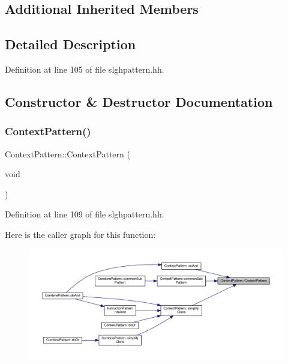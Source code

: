 \subsection*{Additional Inherited Members}


\subsection{Detailed Description}


Definition at line 105 of file slghpattern.\+hh.



\subsection{Constructor \& Destructor Documentation}
\mbox{\label{class_context_pattern_a66b65ac40587ea7fcb7056341ae5a217}} 
\subsubsection{\texorpdfstring{ContextPattern()}{ContextPattern()}\hspace{0.1cm}{\footnotesize\ttfamily [1/2]}}
{\footnotesize\ttfamily Context\+Pattern\+::\+Context\+Pattern (\begin{DoxyParamCaption}\item[{void}]{ }\end{DoxyParamCaption})\hspace{0.3cm}{\ttfamily [inline]}}



Definition at line 109 of file slghpattern.\+hh.

Here is the caller graph for this function\+:
\nopagebreak
\begin{figure}[H]
\begin{center}
\leavevmode
\includegraphics[width=350pt]{class_context_pattern_a66b65ac40587ea7fcb7056341ae5a217_icgraph}
\end{center}
\end{figure}
\mbox{\label{class_context_pattern_a2b3f651f71bc240b9eabc99e0aa41b52}} 
